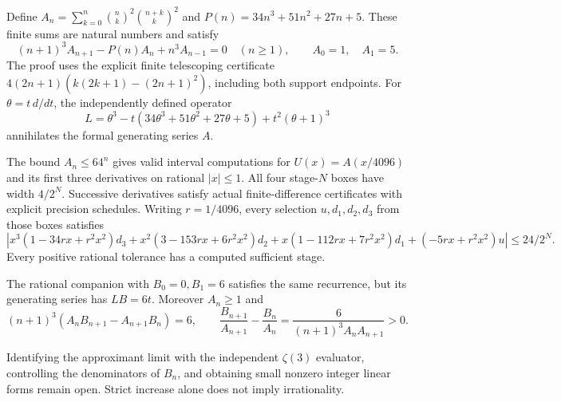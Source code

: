 \begin{theorem}
\label{thm:apery-binomial-ode}
Define $A_n=\sum_{k=0}^n\binom nk^2\binom{n+k}k^2$ and
$P(n)=34n^3+51n^2+27n+5$. These finite sums are natural numbers and satisfy
\[
 (n+1)^3A_{n+1}-P(n)A_n+n^3A_{n-1}=0\quad(n\ge1),
 \qquad A_0=1,\quad A_1=5.
\]
The proof uses the explicit finite telescoping certificate
$4(2n+1)(k(2k+1)-(2n+1)^2)$, including both support endpoints.
For $\theta=t\,d/dt$, the independently defined operator
\[
 L=\theta^3-t(34\theta^3+51\theta^2+27\theta+5)+t^2(\theta+1)^3
\]
annihilates the formal generating series $A$.
\leanok
\end{theorem}

\begin{theorem}
\label{thm:apery-boxed-equation}
The bound $A_n\le64^n$ gives valid interval computations for
$U(x)=A(x/4096)$ and its first three derivatives on rational $|x|\le1$.
All four stage-$N$ boxes have width $4/2^N$. Successive derivatives satisfy
actual finite-difference certificates with explicit precision schedules.
Writing $r=1/4096$, every selection $u,d_1,d_2,d_3$ from those boxes satisfies
\[
 \left|x^3(1-34rx+r^2x^2)d_3+x^2(3-153rx+6r^2x^2)d_2
 +x(1-112rx+7r^2x^2)d_1+(-5rx+r^2x^2)u\right|\le24/2^N.
\]
Every positive rational tolerance has a computed sufficient stage.
\leanok
\end{theorem}

\begin{theorem}
\label{thm:apery-casoratian}
The rational companion with $B_0=0,B_1=6$ satisfies the same recurrence,
but its generating series has $LB=6t$. Moreover $A_n\ge1$ and
\[
 (n+1)^3(A_nB_{n+1}-A_{n+1}B_n)=6,\qquad
 \frac{B_{n+1}}{A_{n+1}}-\frac{B_n}{A_n}
 =\frac6{(n+1)^3A_nA_{n+1}}>0.
\]
\leanok
\end{theorem}

Identifying the approximant limit with the independent $\zeta(3)$ evaluator,
controlling the denominators of $B_n$, and obtaining small nonzero integer
linear forms remain open. Strict increase alone does not imply irrationality.
